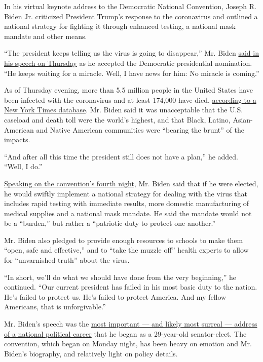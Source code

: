 In his virtual keynote address to the Democratic National Convention,
Joseph R. Biden Jr. criticized President Trump's response to the
coronavirus and outlined a national strategy for fighting it through
enhanced testing, a national mask mandate and other means.

``The president keeps telling us the virus is going to disappear,'' Mr.
Biden
\href{https://www.nytimes3xbfgragh.onion/2020/08/20/us/politics/biden-presidential-nomination-dnc.html}{said
in his speech on Thursday} as he accepted the Democratic presidential
nomination. ``He keeps waiting for a miracle. Well, I have news for him:
No miracle is coming.''

As of Thursday evening, more than 5.5 million people in the United
States have been infected with the coronavirus and at least 174,000 have
died,
\href{https://www.nytimes3xbfgragh.onion/interactive/2020/us/coronavirus-us-cases.html}{according
to a New York Times database}. Mr. Biden said it was unacceptable that
the U.S. caseload and death toll were the world's highest, and that
Black, Latino, Asian-American and Native American communities were
``bearing the brunt'' of the impacts.

``And after all this time the president still does not have a plan,'' he
added. ``Well, I do.''

\href{https://www.nytimes3xbfgragh.onion/live/2020/08/20/us/dnc-convention-election}{Speaking
on the convention's fourth night}, Mr. Biden said that if he were
elected, he would swiftly implement a national strategy for dealing with
the virus that includes rapid testing with immediate results, more
domestic manufacturing of medical supplies and a national mask mandate.
He said the mandate would not be a ``burden,'' but rather a ``patriotic
duty to protect one another.''

Mr. Biden also pledged to provide enough resources to schools to make
them ``open, safe and effective,'' and to ``take the muzzle off'' health
experts to allow for ``unvarnished truth'' about the virus.

``In short, we'll do what we should have done from the very beginning,''
he continued. ``Our current president has failed in his most basic duty
to the nation. He's failed to protect us. He's failed to protect
America. And my fellow Americans, that is unforgivable.''

Mr. Biden's speech was the
\href{https://www.nytimes3xbfgragh.onion/2020/08/20/us/politics/joe-biden-convention-speech.html}{most
important --- and likely most surreal --- address of a national
political career} that he began as a 29-year-old senator-elect. The
convention, which began on Monday night, has been heavy on emotion and
Mr. Biden's biography, and relatively light on policy details.

